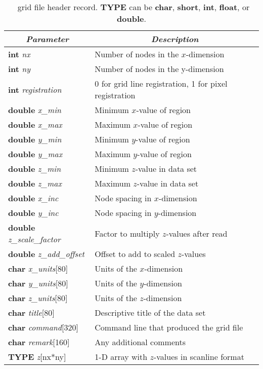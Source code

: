 \begin{table}
\centering
\begin{tabular}{|l|l|} \hline
\multicolumn{1}{|c}{\emph{Parameter}}   &       \multicolumn{1}{|c|}{\emph{Description}}        \\ \hline
\textbf{int} \emph{nx}                      &       Number of nodes in the $x$-dimension    \\ \hline
\textbf{int} \emph{ny}                      &       Number of nodes in the y-dimension      \\ \hline
\textbf{int} \emph{registration}    &       0 for grid line registration, 1 for pixel registration  \\ \hline
\textbf{double} \emph{x\_min}               &       Minimum $x$-value of region     \\ \hline
\textbf{double} \emph{x\_max}               &       Maximum $x$-value of region  \\ \hline
\textbf{double} \emph{y\_min}               &       Minimum $y$-value of region  \\ \hline
\textbf{double} \emph{y\_max}               &       Maximum $y$-value of region  \\ \hline
\textbf{double} \emph{z\_min}               &       Minimum $z$-value in data set  \\ \hline
\textbf{double} \emph{z\_max}               &       Maximum $z$-value in data set  \\ \hline
\textbf{double} \emph{x\_inc}               &       Node spacing in $x$-dimension  \\ \hline
\textbf{double} \emph{y\_inc}               &       Node spacing in $y$-dimension  \\ \hline
\textbf{double} \emph{z\_scale\_factor}     &       Factor to multiply $z$-values after read  \\ \hline
\textbf{double} \emph{z\_add\_offset}       &       Offset to add to scaled $z$-values  \\ \hline
\textbf{char} \emph{x\_units}[80]   &       Units of the $x$-dimension      \\ \hline
\textbf{char} \emph{y\_units}[80]   &       Units of the $y$-dimension      \\ \hline
\textbf{char} \emph{z\_units}[80]   &       Units of the $z$-dimension      \\ \hline
\textbf{char} \emph{title}[80]      &       Descriptive title of the data set       \\ \hline
\textbf{char} \emph{command}[320]   &       Command line that produced the grid file  \\ \hline
\textbf{char} \emph{remark}[160]    &       Any additional comments \\ \hline \hline
\textbf{TYPE} \emph{z}[nx*ny]      &       1-D array with $z$-values in scanline format \\ \hline
\end{tabular}
\caption{\gmt\ grid file header record. \textbf{TYPE} can be \textbf{char}, \textbf{short}, \textbf{int},
\textbf{float}, or {\bf
double}.}
\label{tbl:grdheader}
\end{table}

